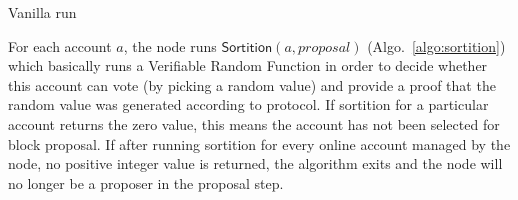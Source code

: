\documentclass[10pt,a4paper]{article}
\begin{document}
\begin{section}{Vanilla run}
    
    
    For each account $a$, the node runs $\mathsf{Sortition}(a, proposal)$ (Algo.~\ref{algo:sortition}) 
    which basically runs a Verifiable Random Function in order to decide whether this account 
    can vote (by picking a random value) and provide a proof that the random value was generated according
    to protocol.
    If sortition for a particular account returns the zero value, this means the account has
    not been selected for block proposal. %
    If after running sortition for every online account managed by the node, no positive integer value is returned,
    the algorithm exits and the node will no longer be a proposer in the proposal step.

\end{section}
\end{document}
